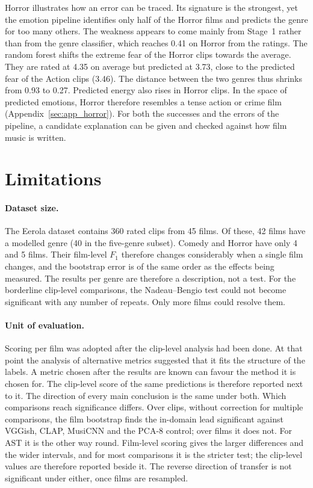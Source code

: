 Horror illustrates how an error can be traced. Its signature is the strongest, yet the emotion
pipeline identifies only half of the Horror films and predicts the genre for too many others.
The weakness appears to come mainly from Stage~1 rather than from the genre classifier, which
reaches 0.41 on Horror from the ratings. The random forest shifts the extreme fear of the Horror clips towards the
average. They are rated at 4.35 on average but predicted at 3.73, close to the predicted
fear of the Action clips (3.46). The distance between the two genres thus shrinks from 0.93
to 0.27. Predicted energy also rises in Horror clips. In the space of predicted emotions,
Horror therefore resembles a tense action or crime film (Appendix~\ref{sec:app_horror}).
For both the successes and the errors of the pipeline, a candidate explanation can be
given and checked against how film music is written.

\section{Limitations}
\label{sec:disc_limitations}

\paragraph{Dataset size.} The Eerola dataset contains 360 rated clips from 45 films. Of
these, 42 films have a modelled genre (40 in the five-genre subset). Comedy and Horror have
only 4 and 5 films. Their film-level $F_1$ therefore changes considerably when a single film
changes, and the bootstrap error is of the same order as the effects being measured. The
results per genre are therefore a description, not a test. For the borderline clip-level
comparisons, the Nadeau--Bengio test could not become significant with any number of
repeats. Only more films could resolve them. 

\paragraph{Unit of evaluation.} Scoring per film was adopted after the clip-level analysis had been done. At that point the analysis of alternative metrics suggested that it fits the
structure of the labels. A metric chosen after the results are known can favour the method
it is chosen for. The clip-level score of the same predictions is therefore reported next
to it. The direction of every main conclusion is the same under both. Which comparisons
reach significance differs. Over clips, without correction for multiple comparisons, the film bootstrap finds the in-domain lead
significant against VGGish, CLAP, MusiCNN and the PCA-8 control; over films it does not.
For AST it is the other way round. Film-level scoring gives the larger differences and the wider intervals, and for most comparisons it is the stricter test; the clip-level values are therefore reported beside it. The reverse
direction of transfer is not significant under either, once films are resampled.


